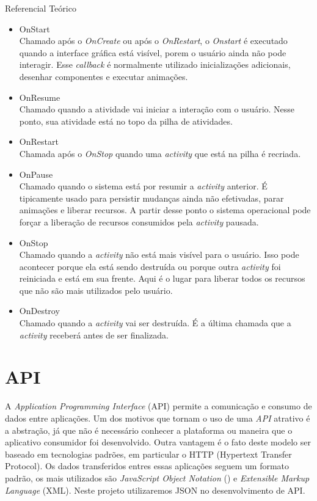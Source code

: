 \documentclass[
	12pt,				%
	openright,			%
	twoside,			%
	a4paper,			%
	english,			%
	french,				%
	spanish,			%
	brazil				%
	]{abntex2}
\begin{document}
\begin{chapter}{Referencial Teórico}
\begin{itemize}
     \newpage
     \item{OnStart} \\
     Chamado após o \textit{OnCreate} ou após o \textit{OnRestart}, o \textit{Onstart} é executado quando a interface gráfica está visível, porem o usuário ainda não pode interagir. Esse \textit{callback} é normalmente utilizado inicializações adicionais, desenhar componentes e executar animações.
     \item{OnResume} \\
      Chamado quando a atividade vai iniciar a interação com o usuário. Nesse ponto, sua atividade está no topo da pilha de atividades.
      \item{OnRestart} \\
      Chamada após o \textit{OnStop} quando uma \textit{activity} que está na pilha é recriada.
     \item{OnPause} \\
     Chamado quando o sistema está por resumir a \textit{activity} anterior. É tipicamente usado para persistir mudanças ainda não efetivadas, parar animações e liberar recursos. A partir desse ponto o sistema operacional pode forçar a liberação de recursos consumidos pela \textit{activity} pausada.
     \item{OnStop} \\
    Chamado quando a \textit{activity} não está mais visível para o usuário. Isso pode acontecer porque ela está sendo destruída ou porque outra  \textit{activity} foi reiniciada e está em sua frente. Aqui é o lugar para liberar todos os recursos que não são mais utilizados pelo usuário.
     \item{OnDestroy} \\
     Chamado quando a \textit{activity} vai ser destruída. É a última chamada que a \textit{activity} receberá antes de ser finalizada.
  \end{itemize}

\section{API} \label{API}
A \textit{Application Programming Interface} (API) permite a comunicação e consumo de dados entre aplicações. Um dos motivos que tornam o uso de uma \textit{API} atrativo é a abstração, já que não é necessário conhecer a plataforma ou maneira que o aplicativo consumidor foi desenvolvido. Outra vantagem é o fato deste modelo ser baseado em tecnologias padrões, em particular o HTTP (Hypertext Transfer Protocol). Os dados transferidos entres essas aplicações seguem um formato padrão, os mais utilizados são \textit{JavaScript Object Notation} () e \textit{Extensible Markup Language} (XML). Neste projeto utilizaremos JSON no desenvolvimento de API.


\end{chapter}
\end{document}
